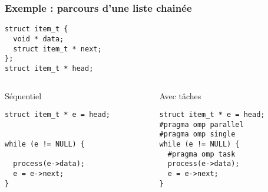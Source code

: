 \documentclass{beamer}
\begin{document}
\begin{frame}[fragile]
  \frametitle{Exemple : parcours d'une liste chainée}

\begin{verbatim}
struct item_t {
  void * data;
  struct item_t * next;
};
struct item_t * head;
\end{verbatim}

\begin{columns}[T]
  \begin{column}{0.49\textwidth}
    \begin{block}{Séquentiel}
\begin{verbatim}
struct item_t * e = head;


while (e != NULL) {

  process(e->data);
  e = e->next;
}
\end{verbatim}
    \end{block}
  \end{column}

  \begin{column}{0.49\textwidth}
    \begin{block}{Avec tâches\phantom{Sq}}
\begin{verbatim}
struct item_t * e = head;
#pragma omp parallel
#pragma omp single
while (e != NULL) {
  #pragma omp task
  process(e->data);
  e = e->next;
}
\end{verbatim}
    \end{block}
  \end{column}
\end{columns}
\end{frame}
\end{document}
